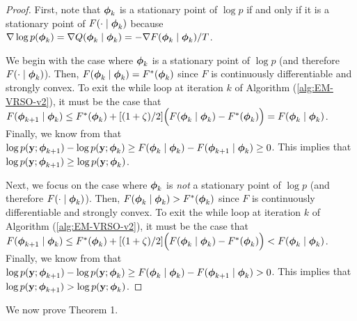 \begin{proof}

First, note that $\boldsymbol{\phi}_k$ is a stationary point of $\log p$ if and only if it is a stationary point of $F(\cdot \mid \boldsymbol{\phi}_k)$ because $\nabla \log p(\boldsymbol{\phi}_k) = \nabla Q(\boldsymbol{\phi}_k \mid \boldsymbol{\phi}_k) = -\nabla F(\boldsymbol{\phi}_k \mid \boldsymbol{\phi}_k) / T$.

We begin with the case where $\boldsymbol{\phi}_k$ is a stationary point of $\log p$ (and therefore $F(\cdot \mid \boldsymbol{\phi}_k)$). Then, $F(\boldsymbol{\phi}_k \mid \boldsymbol{\phi}_k) = F^{*}(\boldsymbol{\phi}_{k})$ since $F$ is continuously differentiable and strongly convex. To exit the while loop at iteration $k$ of Algorithm (\ref{alg:EM-VRSO-v2}), it must be the case that $F(\boldsymbol{\phi}_{k+1} \mid \boldsymbol{\phi}_{k}) \leq F^*(\boldsymbol{\phi}_{k}) + [(1+\zeta)/2] \Big(F(\boldsymbol{\phi}_{k} \mid \boldsymbol{\phi}_{k}) - F^*(\boldsymbol{\phi}_{k}) \Big) = F(\boldsymbol{\phi}_k \mid \boldsymbol{\phi}_k)$. Finally, we know from \citet{Dempster:1977} that $\log p(\mathbf{y} ; \boldsymbol{\phi}_{k+1}) - \log p(\mathbf{y} ; \boldsymbol{\phi}_{k}) \geq F(\boldsymbol{\phi}_{k} \mid \boldsymbol{\phi}_{k}) - F(\boldsymbol{\phi}_{k+1} \mid \boldsymbol{\phi}_{k}) \geq 0$. This implies that $\log p(\mathbf{y} ; \boldsymbol{\phi}_{k+1}) \geq \log p(\mathbf{y} ; \boldsymbol{\phi}_{k})$.

Next, we focus on the case where $\boldsymbol{\phi}_k$ is \textit{not} a stationary point of $\log p$ (and therefore $F(\cdot \mid \boldsymbol{\phi}_k)$). Then, $F(\boldsymbol{\phi}_k \mid \boldsymbol{\phi}_k) > F^{*}(\boldsymbol{\phi}_{k})$ since $F$ is continuously differentiable and strongly convex. To exit the while loop at iteration $k$ of Algorithm (\ref{alg:EM-VRSO-v2}), it must be the case that $F(\boldsymbol{\phi}_{k+1} \mid \boldsymbol{\phi}_{k}) \leq F^*(\boldsymbol{\phi}_{k}) + [(1+\zeta)/2] \Big(F(\boldsymbol{\phi}_{k} \mid \boldsymbol{\phi}_{k}) - F^*(\boldsymbol{\phi}_{k}) \Big) < F(\boldsymbol{\phi}_k \mid \boldsymbol{\phi}_k)$. Finally, we know from \citet{Dempster:1977} that $\log p(\mathbf{y} ; \boldsymbol{\phi}_{k+1}) - \log p(\mathbf{y} ; \boldsymbol{\phi}_{k}) \geq F(\boldsymbol{\phi}_{k} \mid \boldsymbol{\phi}_{k}) - F(\boldsymbol{\phi}_{k+1} \mid \boldsymbol{\phi}_{k}) > 0$. This implies that $\log p(\mathbf{y} ; \boldsymbol{\phi}_{k+1}) > \log p(\mathbf{y} ; \boldsymbol{\phi}_{k})$.
\end{proof}

We now prove Theorem 1.

